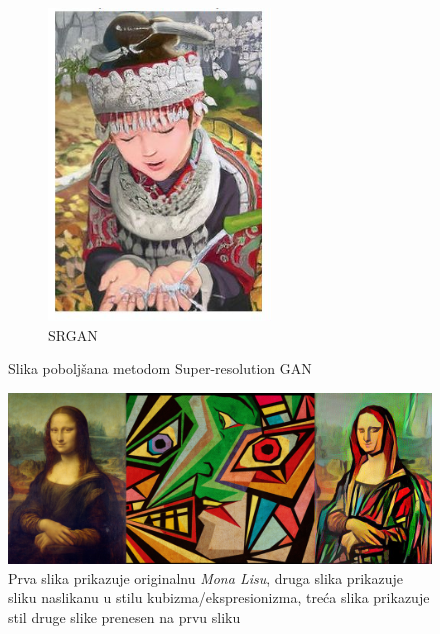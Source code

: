 \begin{enumerate}
\begin{figure}[H]
\begin{subfigure}[b]{0.4\linewidth}
		\includegraphics[width=\linewidth]{img/SRGAN.png}
		\caption{SRGAN}
	\end{subfigure}
	\caption{Slika poboljšana metodom Super-resolution GAN \citep{SRGAN}}
	\label{img:SRGAN}
\end{figure}

\begin{figure}[H]
	\centering
	\includegraphics[width=\linewidth]{img/StyleTransfer.png}
	\caption{Prva slika prikazuje originalnu \textit{Mona Lisu}, druga slika prikazuje sliku naslikanu u stilu kubizma/ekspresionizma, treća slika prikazuje stil druge slike prenesen na prvu sliku}
	\label{img:styleTransfer}
\end{figure}


\end{enumerate}

